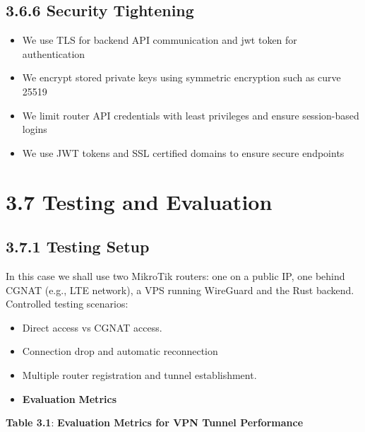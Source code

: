 \documentclass[12pt,a4paper,oneside]{report}
\begin{document}
\subsection{3.6.6 Security Tightening}

\begin{itemize}
  \item We use TLS for backend API communication and jwt token for authentication
  \item We encrypt stored private keys using symmetric encryption such as curve 25519
  \item We limit router API credentials with least privileges and ensure session-based logins
  \item We use JWT tokens and SSL certified domains to ensure secure endpoints
\end{itemize}



\section{3.7 Testing and Evaluation}

\subsection{3.7.1 Testing Setup}

In this case we shall use two MikroTik routers: one on a public IP, one behind CGNAT (e.g., LTE network), a VPS running WireGuard and the Rust backend. Controlled testing scenarios:


\begin{itemize}
  \item Direct access vs CGNAT access. 
  \item Connection drop and automatic reconnection
  \item Multiple router registration and tunnel establishment.        
\end{itemize}







\begin{itemize}
  \item \textbf{E}\textbf{v}\textbf{al}\textbf{u}\textbf{a}\textbf{t}\textbf{i}\textbf{o}\textbf{n}\textbf{ }\textbf{M}\textbf{e}\textbf{t}\textbf{r}\textbf{i}\textbf{cs}
\end{itemize}

\textbf{Table 3.1}: \textbf{Evaluation Metrics for VPN Tunnel Performance}
\end{document}
